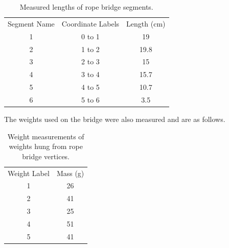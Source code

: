 \documentclass[10pt,letterpaper,onecolumn,report]{tau-class/tau}
\begin{document}
        \begin{table}[H]
            \centering
            \setcounter{table}{4} %
            \begin{tabular}{ccc}
                 Segment Name
                &  Coordinate Labels
                & Length (cm)
                \\
                                 1
                &  0 to 1
                & 19
                \\
                                 2
                &  1 to 2
                & 19.8
                \\
                                 3
                &  2 to 3
                & 15
                \\
                                 4
                &  3 to 4
                & 15.7
                \\
                                 5
                &  4 to 5
                & 10.7
                \\
                                 6
                &  5 to 6
                & 3.5
                \\
            \end{tabular}
            \caption{Measured lengths of rope bridge segments.}
            \label{tab:my_label}
        \end{table}

        The weights used on the bridge were also measured and are as follows.
        
        \begin{table}[H]
            \centering
            \setcounter{table}{5} %
            \begin{tabular}{cc}
                 Weight Label& Mass (g)\\
                 1& 26\\
                 2& 41\\
                 3& 25\\
                 4& 51\\
                 5& 41\\
            \end{tabular}
            \caption{Weight measurements of weights hung from rope bridge vertices.}
            \label{tab:my_label}
        \end{table}
\end{document}
